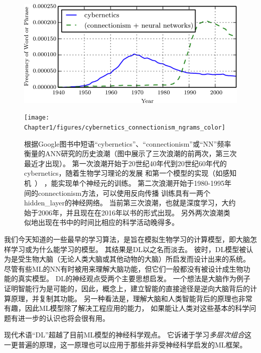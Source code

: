 \begin{figure}[!htb]
\ifOpenSource
\centerline{\includegraphics[scale=0.5]{images/7.png}}
\else
\centerline{\texttt{[image: Chapter1/figures/cybernetics\_connectionism\_ngrams\_color]}}
\fi
\caption{根据Google图书中短语``\gls{cybernetics}''、``\gls{connectionism}''或``\gls{NN}''频率衡量的\gls{ANN}研究的历史浪潮（图中展示了三次浪潮的前两次，第三次最近才出现）。
第一次浪潮开始于20世纪40年代到20世纪60年代的\gls{cybernetics}，随着生物学习理论的发展\citep{McCulloch43,Hebb49}
和第一个模型的实现（如感知机~\citep{Rosenblatt-1958}） ，能实现单个神经元的训练。
第二次浪潮开始于1980-1995年间的\gls{connectionism}方法，可以使用反向传播\citep{Rumelhart86b-small} 训练具有一两个\gls{hidden_layer}的神经网络。
当前第三次浪潮，也就是深度学习，大约始于2006年\citep{Hinton06,Bengio-NIPS2007,ranzato-07-small}，并且现在在2016年以书的形式出现。
另外两次浪潮类似地出现在书中的时间比相应的科学活动晚得多。
}
\label{fig:chap1_cybernetics_connectionism_ngrams_color}
\end{figure}


我们今天知道的一些最早的学习算法，是旨在模拟生物学习的计算模型，即大脑怎样学习或为什么能学习的模型。
其结果是\gls{DL}以之名而淡去。
彼时，\gls{DL}模型被认为是受生物大脑（无论人类大脑或其他动物的大脑）所启发而设计出来的系统。
尽管有些\gls{ML}的\gls{NN}有时被用来理解大脑功能\citep{hinton1991lesioning}，但它们一般都没有被设计成生物功能的真实模型。
\gls{DL}的神经观点受两个主要思想启发。
一个想法是大脑作为例子证明智能行为是可能的，因此，概念上，建立智能的直接途径是逆向大脑背后的计算原理，并复制其功能。
另一种看法是，理解大脑和人类智能背后的原理也非常有趣，因此\gls{ML}模型除了解决工程应用的能力， 如果能让人类对这些基本的科学问题有进一步的认识也将会很有用。

  
现代术语``\gls{DL}''超越了目前\gls{ML}模型的神经科学观点。
它诉诸于学习\emph{多层次组合}这一更普遍的原理，这一原理也可以应用于那些并非受神经科学启发的\gls{ML}框架。
 
